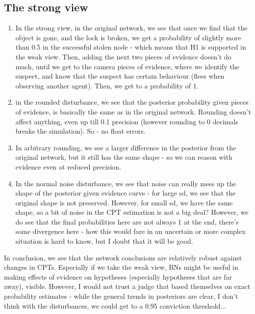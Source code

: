 \documentclass[11pt]{amsart}
\begin{document}
\subsection{The strong view}
\begin{enumerate}
\item In the strong view, in the original network, we see that once we find that the object is gone, and the lock is broken, we get a probability of slightly more than 0.5 in the successful stolen node - which means that H1 is supported in the weak view. Then, adding the next two pieces of evidence doesn't do much, until we get to the camera pieces of evidence, where we identify the suspect, and know that the suspect has certain behaviour (flees when observing another agent). Then, we get to a probability of 1.

\item in the rounded disturbance, we see that the posterior probability given pieces of evidence, is basically the same as in the original network. Rounding doesn't affect anything, even up till 0.1 precision (however rounding to 0 decimals breaks the simulation). So - no float errors.
\item In arbitrary rounding, we see a larger difference in the posterior from the original network, but it still has the same shape - so we can reason with evidence even at reduced precision.
\item In the normal noise disturbance, we see that noise can really mess up the shape of the posterior given evidence curve - for large sd, we see that the original shape is not preserved. However, for small sd, we have the same shape, so a bit of noise in the CPT estimation is not a big deal? However, we do see that the final probabilities here are not always 1 at the end, there's some divergence here - how this would fare in an uncertain or more complex situation is hard to know, but I doubt that it will be good.


\end{enumerate}

In conclusion, we see that the network conclusions are relatively robust against changes in CPTs. Especially if we take the weak view, BNs might be useful in making effects of evidence on hypotheses (especially hypotheses that are far away), visible. However, I would not trust a judge that based themselves on exact probability estimates - while the general trends in posteriors are clear, I don't think with the disturbances, we could get to a 0.95 conviction threshold...
\end{document}
